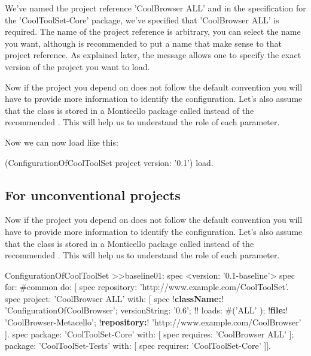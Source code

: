\documentclass[a4paper,10pt,twoside]{book}
\begin{document}
We've named the project reference 'CoolBrowser ALL' and in the specification for the 'CoolToolSet-Core' package, we've specified that 'CoolBrowser ALL' is required. The name of the project reference is arbitrary, you can select the name you want, although is recommended to put a name that make sense to that project reference. 
As explained later, the message  allows one to specify the exact version of the project you want to load.
 


Now if the project you depend on does not follow the default convention you will have to provide more information to identify the configuration. Let's also assume  that the class  is stored in a Monticello package called  instead of the recommended . This will help us to understand the role of each parameter. 


Now we can now load  like this:

\begin{code}{}
(ConfigurationOfCoolToolSet project version: '0.1') load.
\end{code}


\subsection{For unconventional projects}

Now if the project you depend on does not follow the default convention you will have to provide more information to identify
the configuration. Let's also assume  that the class  is stored in a Monticello package called  instead of the recommended . This will help us to understand the role of each parameter. 


\begin{code}{}
ConfigurationOfCoolToolSet >>baseline01: spec 
       <version: '0.1-baseline'>
       spec for: #common do: [
              spec repository: 'http://www.example.com/CoolToolSet'.
              spec project: 'CoolBrowser ALL' with: [
                            spec 
                                   !\textbf{className:}! 'ConfigurationOfCoolBrowser';
                                   versionString: '0.6'; !!
                                   loads: #('ALL' );
                                   !\textbf{file:}! 'CoolBrowser-Metacello';
                                   !\textbf{repository:}! 'http://www.example.com/CoolBrowser' ].
              spec 
                     package: 'CoolToolSet-Core' with: [ spec requires: 'CoolBrowser ALL' ];
                     package: 'CoolToolSet-Tests' with: [ spec requires: 'CoolToolSet-Core' ]].
\end{code}       
\end{document}
